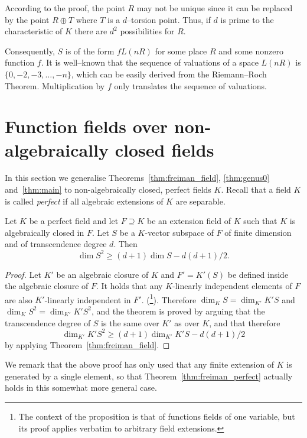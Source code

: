 \documentclass[ALCO,Unicode,ThmDefs]{cedram}
\renewcommand{\geq}{\geqslant}
\begin{document}
\begin{rema}
According to the proof, the point $R$ may not be unique since it can be replaced by the point $R \oplus T$ where $T$ is a $d$--torsion point. Thus, if $d$ is prime to the characteristic of $K$ there are $d^2$ possibilities for $R$.
\end{rema}

Consequently, $S$ is of the form $f L(nR)$ for some place $R$ and some nonzero function $f$. It is well--known that the sequence of valuations of a space $L(nR)$ is $\{0, -2, -3, \ldots, -n\}$, which can be easily derived from the Riemann--Roch Theorem. Multiplication by $f$ only translates the sequence of valuations.


\section{{Function fields over non-algebraically closed fields}}\label{sec:perfect}

In this section we generalise Theorems~\ref{thm:freiman_field}, \ref{thm:genus0} and~\ref{thm:main} to non-algebraically closed, perfect fields $K$. Recall that a field $K$ is called \emph{perfect} if all algebraic extensions of $K$ are separable.

\begin{theo}\label{thm:freiman_perfect}
Let $K$ be a perfect field and let $F \supseteq K$ be an extension field of $K$ such that $K$ is algebraically closed in $F$. Let $S$ be a $K$-vector subspace of $F$ of finite dimension and of transcendence degree $d$. Then
\[
\dim S^2\geq(d+1)\dim S -d(d+1)/2.
\]
\end{theo}

\begin{proof}
Let $K'$ be an algebraic closure of $K$ and $F'=K'(S)$ be defined inside the algebraic closure of $F$. It holds that any $K$-linearly independent elements of $F$ are also $K'$-linearly independent in $F'$. (\cite[Proposition~III.6.1]{Stichtenoth}\footnote{The context of the proposition is that of functions fields of one variable, but its proof applies verbatim to arbitrary field extensions.}). Therefore $\dim_KS=\dim_{K'}K'S$ and $\dim_KS^2=\dim_{K'}K'S^2$, and the theorem is proved by arguing that the transcendence degree of $S$ is the same over $K'$ as over $K$, and that therefore
\[
\dim_{K'}K'S^2\geq(d+1)\dim_{K'}K'S -d(d+1)/2
\]
by applying Theorem~\ref{thm:freiman_field}.
\end{proof}

We remark that the above proof has only used that any finite extension of $K$ is generated by a single element, so that Theorem~\ref{thm:freiman_perfect} actually holds in this somewhat more general case.
\end{document}
